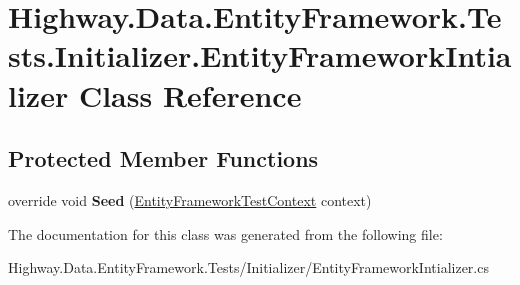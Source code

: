 \hypertarget{class_highway_1_1_data_1_1_entity_framework_1_1_tests_1_1_initializer_1_1_entity_framework_intializer}{\section{Highway.\-Data.\-Entity\-Framework.\-Tests.\-Initializer.\-Entity\-Framework\-Intializer Class Reference}
\label{class_highway_1_1_data_1_1_entity_framework_1_1_tests_1_1_initializer_1_1_entity_framework_intializer}
}
\subsection*{Protected Member Functions}
\begin{DoxyCompactItemize}
\item 
\hypertarget{class_highway_1_1_data_1_1_entity_framework_1_1_tests_1_1_initializer_1_1_entity_framework_intializer_ac1b9ef451004236bebb6f8290600fa20}{override void {\bfseries Seed} (\hyperlink{class_highway_1_1_data_1_1_entity_framework_1_1_tests_1_1_unit_tests_1_1_entity_framework_test_context}{Entity\-Framework\-Test\-Context} context)}\label{class_highway_1_1_data_1_1_entity_framework_1_1_tests_1_1_initializer_1_1_entity_framework_intializer_ac1b9ef451004236bebb6f8290600fa20}

\end{DoxyCompactItemize}


The documentation for this class was generated from the following file\-:\begin{DoxyCompactItemize}
\item 
Highway.\-Data.\-Entity\-Framework.\-Tests/\-Initializer/Entity\-Framework\-Intializer.\-cs\end{DoxyCompactItemize}
